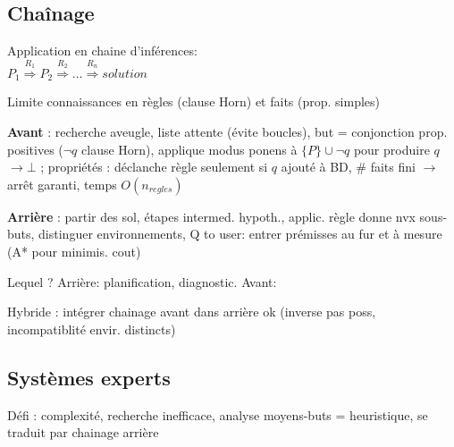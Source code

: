 \subsection*{Chaînage}

Application en chaine d'inférences:\\
$P_1 \stackrel{R_1}{\Rightarrow} P_2 \stackrel{R_2}{\Rightarrow} \dots \stackrel{R_n}{\Rightarrow} solution$

Limite connaissances en règles (clause Horn) et faits (prop. simples)

\textbf{Avant} : recherche aveugle, liste attente (évite boucles), but = conjonction prop. positives ($\lnot q$ clause Horn), applique modus ponens à $\{P\}\cup \lnot q$ pour produire $q$ $\rightarrow \bot$ ; propriétés : déclanche règle seulement si $q$ ajouté à BD, \# faits fini $\rightarrow$ arrêt garanti, temps $O(n_{regles})$

\textbf{Arrière} : partir des sol, étapes intermed. hypoth., applic. règle donne nvx sous-buts, distinguer environnements, Q to user: entrer prémisses au fur et à mesure (A* pour minimis. cout) 

Lequel ? Arrière: planification, diagnostic. Avant: 

Hybride : intégrer chainage avant dans arrière ok (inverse pas poss, incompatiblité envir. distincts)



\subsection*{Systèmes experts}

Défi : complexité, recherche inefficace, analyse moyens-buts = heuristique, se traduit par chainage arrière 